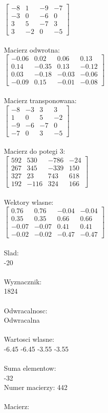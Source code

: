 \documentclass[a4paper,12pt]{article}
\begin{document}
$\begin{bmatrix} -8&1&-9&-7\\-3&0&-6&0\\3&5&-7&3\\3&-2&0&-5 \end{bmatrix}$
\\
\\
Macierz odwrotna:\\

$\begin{bmatrix} -0.06&0.02&0.06&0.13\\0.14&-0.35&0.13&-0.12\\0.03&-0.18&-0.03&-0.06\\-0.09&0.15&-0.01&-0.08 \end{bmatrix}$
\\
\\
Macierz transponowana:\\

$\begin{bmatrix} -8&-3&3&3\\1&0&5&-2\\-9&-6&-7&0\\-7&0&3&-5 \end{bmatrix}$
\\
\\
Macierz do potegi 3:\\

$\begin{bmatrix} 592&530&-786&-24\\267&345&-339&150\\327&23&743&618\\192&-116&324&166 \end{bmatrix}$
\\
\\
Wektory wlasne:\\

$\begin{bmatrix} 0.76&0.76&-0.04&-0.04\\0.35&0.35&0.66&0.66\\-0.07&-0.07&0.41&0.41\\-0.02&-0.02&-0.47&-0.47 \end{bmatrix}$
\\
\\
Slad:\\
-20
\\
\\
Wyznacznik:\\
1824
\\
\\
Odwracalnosc:\\
Odwracalna
\\
\\
Wartosci wlasne:\\
-6.45 -6.45 -3.55 -3.55
\\
\\
Suma elementow:\\
-32
\\
\newpage
Numer macierzy:
442
\\
\\
Macierz:\\
\end{document}
